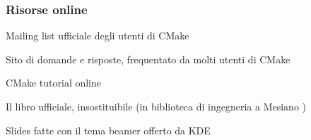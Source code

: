 \documentclass[12pt]{beamer}
\begin{document}
\newcommand{\putlink}[1]{%
   \pgfsetlinewidth{1.4pt}%
   \pgfsetendarrow{\pgfarrowtriangle{4pt}}%
   \pgfline{\pgfxy(1,1)}{\pgfxy(#1,1)}
}

\begin{frame}
  \frametitle{Risorse online}
  \begin{thebibliography}{10}

  \beamertemplatearticlebibitems

	Mailing list ufficiale degli utenti di CMake
	
	Sito di domande e risposte, frequentato da molti utenti di CMake
	
	CMake tutorial online
	
	Il libro ufficiale, insostituibile (in biblioteca di ingegneria a Mesiano )
	
    Slides fatte con il tema beamer offerto da KDE

  \end{thebibliography}
\end{frame}

\end{document}
